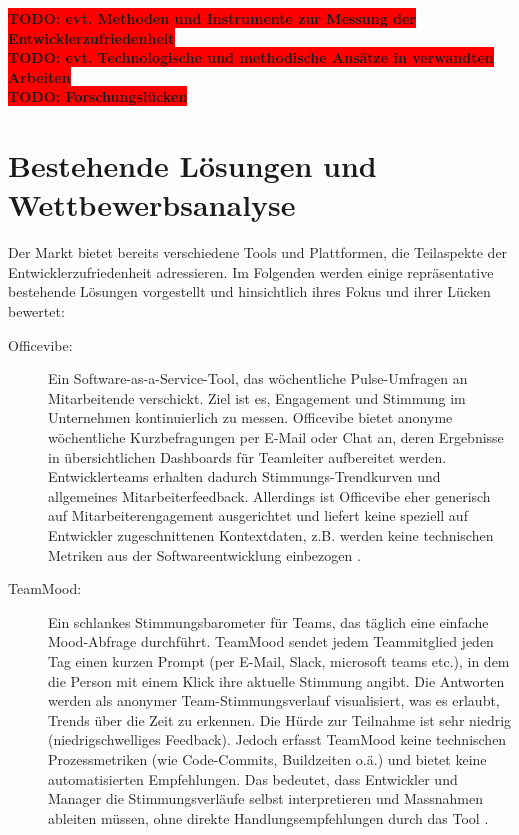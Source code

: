 \documentclass[12pt,a4paper]{report}
\newcommand{\todo}[1]{\colorbox{red}{\textbf{TODO: #1}}\\}
\begin{document}
\todo{evt. Methoden und Instrumente zur Messung der Entwicklerzufriedenheit}
\todo{evt. Technologische und methodische Ansätze in verwandten Arbeiten}
\todo{Forschungslücken}

\section{Bestehende Lösungen und Wettbewerbsanalyse}

Der Markt bietet bereits verschiedene Tools und Plattformen, die Teilaspekte der Entwicklerzufriedenheit adressieren. Im Folgenden
werden einige repräsentative bestehende Lösungen vorgestellt und hinsichtlich ihres Fokus und ihrer Lücken bewertet:

\begin{description}
  \item[Officevibe:] Ein Software-as-a-Service-Tool, das wöchentliche Pulse-Umfragen an Mitarbeitende verschickt. Ziel ist es,
    Engagement und Stimmung im Unternehmen kontinuierlich zu messen. Officevibe bietet anonyme wöchentliche Kurzbefragungen per
    E-Mail oder Chat an, deren Ergebnisse in übersichtlichen Dashboards für Teamleiter aufbereitet werden. Entwicklerteams erhalten
    dadurch Stimmungs-Trendkurven und allgemeines Mitarbeiterfeedback. Allerdings ist Officevibe eher generisch auf
    Mitarbeiterengagement ausgerichtet und liefert keine speziell auf Entwickler zugeschnittenen Kontextdaten, z.B. werden keine
    technischen Metriken aus der Softwareentwicklung einbezogen \cite{courier_officevibe_2025}.

  \item[TeamMood:] Ein schlankes Stimmungsbarometer für Teams, das täglich eine einfache Mood-Abfrage durchführt. TeamMood sendet
    jedem Teammitglied jeden Tag einen kurzen Prompt (per E-Mail, Slack, microsoft teams etc.), in dem die Person mit einem Klick
    ihre aktuelle Stimmung angibt. Die Antworten werden als anonymer Team-Stimmungsverlauf visualisiert, was es erlaubt, Trends über
    die Zeit zu erkennen. Die Hürde zur Teilnahme ist sehr niedrig (niedrigschwelliges Feedback). Jedoch erfasst TeamMood keine
    technischen Prozessmetriken (wie Code-Commits, Buildzeiten o.ä.) und bietet keine automatisierten Empfehlungen. Das bedeutet,
    dass Entwickler und Manager die Stimmungsverläufe selbst interpretieren und Massnahmen ableiten müssen, ohne direkte
    Handlungsempfehlungen durch das Tool \cite{revelo_teammood_2025}.


\end{description}
\end{document}
